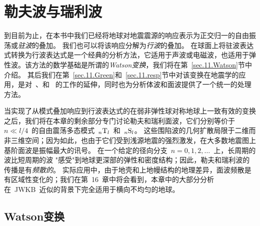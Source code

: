 \chapter{勒夫波与瑞利波}
\label{chapter:surfacewaves}

到目前为止，在本书中我们已经将地球对地震震源的响应表示为正交归一的自由振荡或{\em 驻波\/}的叠加。
我们也可以将该响应分解为{\em 行波\/}的叠加。
%
%
在球面上将驻波表达式转换为行波表达式是一个经典的分析方法，它适用于声波或电磁波，也适用于弹性波。该方法的数学基础是所谓的{\em Watson变换\/}，我们将在第~\ref{sec.11.Watson}节中介绍。
其后我们在第~\ref{sec.11.Green}和~\ref{sec.11.resp}节中对该变换在地震学的应用，是对~\textcite{gilbert76a}、\textcite{dahlen79}和 ~\textcite{snieder&nolet87}的工作的延伸，同时也为分析体波和面波提供了一个统一的处理方法。

当实现了从模式叠加响应到行波表达式的在弱非弹性球对称地球上一致有效的变换之后，我们将在本章的剩余部分专门讨论勒夫和瑞利面波，它们分别等价于~$n\ll l/4$~的自由震荡多态模式~${}_n{\rm T}_l$~和~${}_n{\rm S}_l$。
这些围陷波的几何扩散局限于二维而非三维空间；因为如此，也由于它们受到浅源地震的强烈激发，在大多数地震图上基阶面波是振幅最大的讯号。
在一个给定的径向分支~$n=0,1,2,\ldots$~上，长周期的波比短周期的波 "感受"到地球更深部的弹性和密度结构；因此，勒夫和瑞利波的传播是有{\em 频散的\/}。
%
%
%
%
%
%
实际应用中，由于地壳和上地幔结构的地理差异，面波频散是有区域性变化的；我们在第~16~章中将会看到，本章中的大部分分析在~JWKB~近似的背景下完全适用于横向不均匀的地球。

\section{Watson变换}
%
%
\label{sec.11.Watson}

